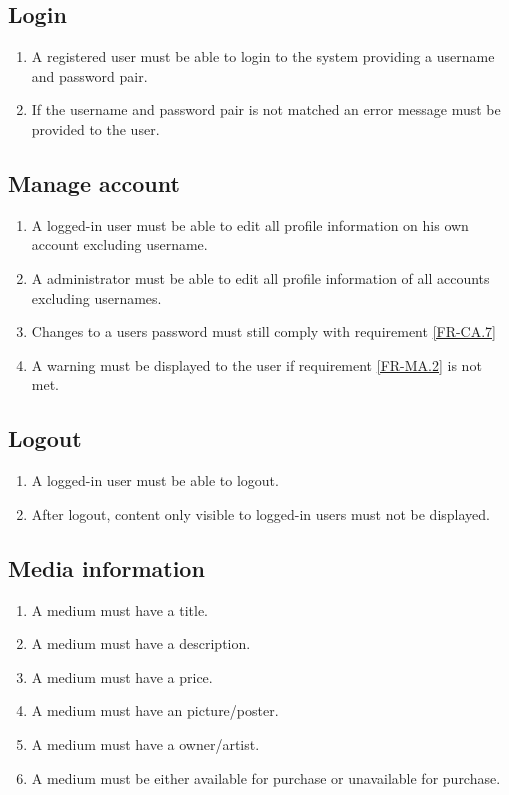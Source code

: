 \documentclass[../report.tex]{subfiles}
\begin{document}
\subsection {Login}
	
\begin{enumerate}[label=FR-\twodigits*, resume]
	\item A registered user must be able to login to the system providing a username and password pair.
	\item If the username and password pair is not matched an error message must be provided to the user. 
\end{enumerate}
		
\subsection {Manage account}

\begin{enumerate}[label=FR-\twodigits*, resume]
	\item A logged-in user must be able to edit all profile information on his own account excluding username.
	\item A administrator must be able to edit all profile information of all accounts excluding usernames.
	\item Changes to a users password must still comply with requirement \ref{FR-CA.7} \label{FR-MA.2}
	\item A warning must be displayed to the user if requirement \ref{FR-MA.2} is not met.	
\end{enumerate}
		
\subsection {Logout}
\begin{enumerate}[label=FR-\twodigits*, resume]
	\item A logged-in user must be able to logout.
	\item After logout, content only visible to logged-in users must not be displayed.
\end{enumerate}
	
\subsection {Media information} \label{FR-Media}

\begin{enumerate}[label=FR-\twodigits*, resume]
	\item A medium must have a title.
	\item A medium must have a description.
	\item A medium must have a price.
	\item A medium must have an picture/poster.
	\item A medium must have a owner/artist.
	\item A medium must be either available for purchase or unavailable for purchase.
\end{enumerate}
\end{document}
